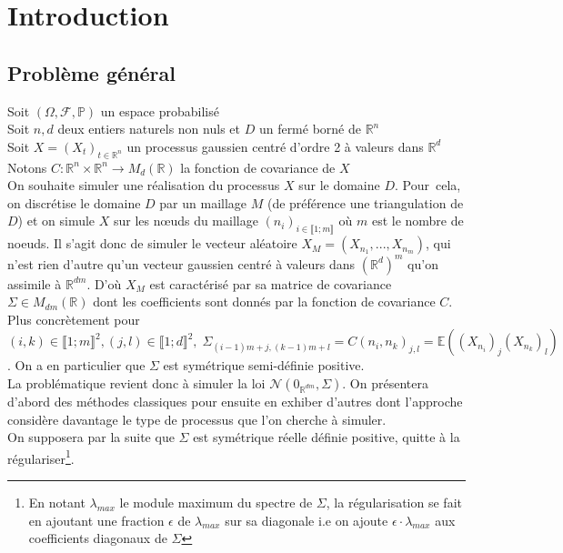 \chapter{Introduction}
\label{introProb}
\section*{Problème général}


\noindent Soit $(\Omega,\mathcal{F},\mathbb{P})$ un espace probabilisé \\
Soit $n,d$ deux entiers naturels non nuls et $D$ un fermé borné de $\mathbb{R}^n$ \\
Soit $X=(X_t)_{t\in \mathbb{R}^n}$ un processus gaussien centré d'ordre 2 à valeurs dans $\mathbb{R}^d$ \\
Notons $C: \mathbb{R}^n \times \mathbb{R}^n \rightarrow M_d(\mathbb{R}) $ la fonction de covariance de $X$ \\

On souhaite simuler une réalisation du processus $X$ sur le domaine $D$. Pour~cela,
on discrétise le domaine $D$ par un maillage $M$ (de préférence une triangulation de $D$) et on
simule $X$ sur les n\oe uds du maillage $(n_i)_{i \in \llbracket 1; m \rrbracket} $ où $m$ est le nombre de noeuds. Il s'agit donc de simuler
le vecteur aléatoire $X_M=(X_{n_1},...,X_{n_m})$, qui n'est rien d'autre qu'un vecteur gaussien centré à valeurs dans $(\mathbb{R}^d)^m$
qu'on assimile à $\mathbb{R}^{dm}$. 
D'où $X_M$ est caractérisé par sa matrice de covariance $\Sigma \in M_{dm}(\mathbb{R})$ dont les coefficients sont donnés
par la fonction de covariance $C$. Plus concrètement pour $(i,k) \in \llbracket 1; m \rrbracket^2, (j,l) \in \llbracket 1; d \rrbracket^2,\; \Sigma_{(i-1)m + j, (k-1)m + l} = C(n_i,n_k)_{j,l} = \mathbb{E}((X_{n_i})_{j}(X_{n_k})_{l}) $. On a en parti\-culier que $\Sigma$ est symétrique semi-définie positive.\\

La problématique revient donc à simuler la loi $\mathcal{N}(0_{\mathbb{R}^{dm}},\Sigma)$. On présentera d'abord des méthodes classiques pour ensuite en exhiber d'autres dont l'approche 
considère davantage le type de processus que l'on cherche à simuler.
~\\

On supposera par la suite que $\Sigma$ est symétrique réelle définie positive, quitte à la régulariser\footnote{En notant $\lambda_{max}$ le module maximum du spectre de $\Sigma$,
la régularisation se fait en ajoutant une fraction $\epsilon$ de $\lambda_{max}$ sur sa diagonale i.e on ajoute $\epsilon \cdot \lambda_{max}$ aux
coefficients diagonaux de $\Sigma$}.
